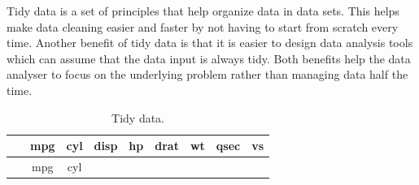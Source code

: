 \documentclass[12pt,oneside]{reedthesis}
\theoremstyle{definition}
\theoremstyle{definition}
\theoremstyle{definition}
\theoremstyle{remark}
\begin{document}
Tidy data is a set of principles that help organize data in data sets.
This helps make data cleaning easier and faster by not having to start
from scratch every time. Another benefit of tidy data is that it is
easier to design data analysis tools which can assume that the data
input is always tidy. Both benefits help the data analyser to focus on
the underlying problem rather than managing data half the time.
\begin{longtable}[]{@{}ccccccccc@{}}
\caption{Tidy data.}\tabularnewline
\toprule
\begin{minipage}[b]{0.24\columnwidth}\centering\strut
~\strut
\end{minipage} & \begin{minipage}[b]{0.07\columnwidth}\centering\strut
mpg\strut
\end{minipage} & \begin{minipage}[b]{0.06\columnwidth}\centering\strut
cyl\strut
\end{minipage} & \begin{minipage}[b]{0.07\columnwidth}\centering\strut
disp\strut
\end{minipage} & \begin{minipage}[b]{0.06\columnwidth}\centering\strut
hp\strut
\end{minipage} & \begin{minipage}[b]{0.07\columnwidth}\centering\strut
drat\strut
\end{minipage} & \begin{minipage}[b]{0.08\columnwidth}\centering\strut
wt\strut
\end{minipage} & \begin{minipage}[b]{0.08\columnwidth}\centering\strut
qsec\strut
\end{minipage} & \begin{minipage}[b]{0.04\columnwidth}\centering\strut
vs\strut
\end{minipage}\tabularnewline
\midrule
\endfirsthead
\toprule
\begin{minipage}[b]{0.24\columnwidth}\centering\strut
~\strut
\end{minipage} & \begin{minipage}[b]{0.07\columnwidth}\centering\strut
mpg\strut
\end{minipage} & \begin{minipage}[b]{0.06\columnwidth}\centering\strut
cyl\strut
\end{minipage} & \begin{minipage}[b]{0.07\columnwidth}\centering\strut

\end{minipage}
\end{longtable}
\end{document}
